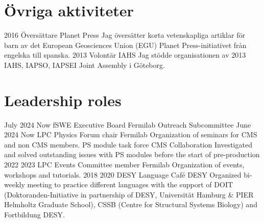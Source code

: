 \ifswedish
  \section{Övriga aktiviteter}
    \position
      {2016 \textemdash{}}
      {Översättare}
      {Planet Press}
      {Jag översätter korta vetenskapliga artiklar för barn av det European Geosciences Union (EGU) Planet Press-initiativet från engelska till spanska.}
    \position
      {2013}
      {Volontär}
      {IAHS}
      {Jag stödde organisationen av 2013 IAHS, IAPSO, IAPSEI Joint Assembly i Göteborg.}
\else
  \section{Leadership roles}
     \position
      {July 2024 \textemdash{} Now} 
      {fSWE Executive Board}
      {Fermilab}
      {Outreach Subcommittee}
     \position
      {June 2024 \textemdash{} Now} 
      {LPC Physics Forum chair}
      {Fermilab}
      {Organization of seminars for CMS and non CMS members.}
      {PS module task force}
      {CMS Collaboration}
      {Investigated and solved outstanding issues with PS modules before the start of pre-production}
     \position
      {2022 \textemdash{} 2023} 
      {LPC Events Committee member}
      {Fermilab}
      {Organization of events, workshops and tutorials.}
    \position
      {2018 \textemdash{} 2020} 
      {DESY Language Café}
      {DESY}
      {Organized bi-weekly meeting to practice different languages with the support of DOIT (Doktoranden-Initiative in partnership of DESY, Universität Hamburg \&  PIER Helmholtz Graduate School), CSSB (Centre for Structural Systems Biology) and Fortbildung DESY.}
\fi
